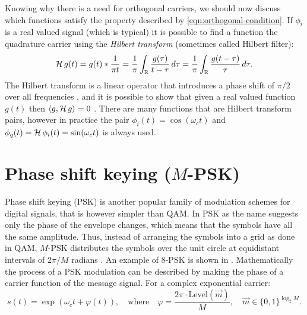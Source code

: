 Knowing why there is a need for orthogonal carriers, we should now discuss which functions satisfy the property described by \eqref{eqn:orthogonal-condition}. If \(\phi_i\) is a real valued signal (which is typical) it is possible to find a function the quadrature carrier using the \emph{Hilbert transform} (sometimes called Hilbert filter):
\begin{equation}
	\operatorname{\mathcal{H}} g(t) = g(t) * \frac{1}{\pi t}
		= \frac{1}{\pi} \int_\mathbb{R} \frac{g(\tau)}{t - \tau} \,d\tau
		= \frac{1}{\pi} \int_\mathbb{R} \frac{g(t - \tau)}{\tau} \,d\tau.
\end{equation}
The Hilbert transform is a linear operator that introduces a phase shift of \(\pi / 2\) over all frequencies \cite{Hsu,Gallager}, and it is possible to show that given a real valued function \(g(t)\) then \(\langle g, \operatorname{\mathcal{H}} g \rangle = 0\) \cite{Kschischang,Kneubuehler}. There are many functions that are Hilbert transform pairs, however in practice the pair \(\phi_i(t) = \cos(\omega_c t)\) and \(\phi_q(t) = \operatorname{\mathcal{H}} \phi_i(t) = \sin(\omega_c t)\) is always used.



\section{Phase shift keying (\(M\)-PSK)}

Phase shift keying (PSK) is another popular family of modulation schemes for digital signals, that is however simpler than QAM. In PSK as the name suggests only the phase of the envelope changes, which means that the symbols have all the same amplitude. Thus, instead of arranging the symbols into a grid as done in QAM, \(M\)-PSK distributes the symbols over the unit circle at equidistant intervals of \(2\pi / M\) radians \cite{Mathis,Kneubuehler}. An example of 8-PSK is shown in . Mathematically the process of a PSK modulation can be described by making the phase of a carrier function of the message signal. For a complex exponential carrier:
\begin{equation}
	s(t) = \exp\left(\omega_c t + \varphi(t)\right), \quad\text{where}\quad
	\varphi = \frac{2\pi \cdot \text{Level}(\vec{m})}{M}, \quad \vec{m} \in \{0,1\}^{\log_2 M}.
\end{equation}

